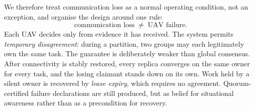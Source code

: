 \documentclass[conference]{IEEEtran}
\begin{document}
We therefore treat communication loss as a normal operating condition, not an
exception, and organise the design around one rule:
\begin{equation*}
  \text{communication loss} \;\neq\; \text{UAV failure}.
\end{equation*}
Each UAV decides only from evidence it has received. The system permits
\emph{temporary disagreement}: during a partition, two groups may each
legitimately own the same task. The guarantee is deliberately weaker than
global consensus. After connectivity is stably restored, every replica
converges on the same owner for every task, and the losing claimant stands
down on its own. Work held by a silent owner is recovered by \emph{lease
expiry}, which requires no agreement. Quorum-certified failure declarations
are still produced, but as belief for situational awareness rather than as a
precondition for recovery.
\end{document}
